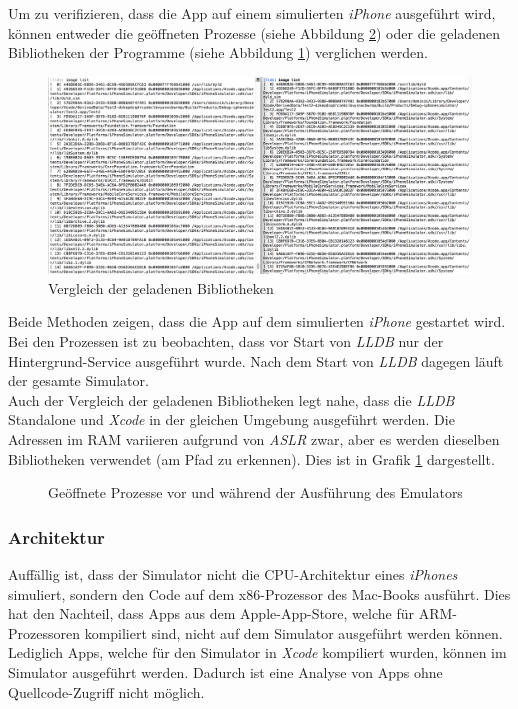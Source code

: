 Um zu verifizieren, dass die App auf einem simulierten \textit{iPhone} ausgeführt wird, können entweder die geöffneten Prozesse (siehe Abbildung \ref{fig:LLDB-creating-IPhone-VM}) oder die geladenen Bibliotheken der Programme (siehe Abbildung \ref{fig:VergleichLLDBImages}) verglichen werden.\\

\begin{figure}[htbp]
	\centering
	\includegraphics[width=\textwidth]{bilder/pentest_mobile_anwendungen/vergleich_aktuelle_situation/20160627_LLDB-image-list.png}
	\caption{Vergleich der geladenen Bibliotheken}
	\label{fig:VergleichLLDBImages}
\end{figure}

Beide Methoden zeigen, dass die App auf dem simulierten \textit{iPhone} gestartet wird. Bei den Prozessen ist zu beobachten, dass vor Start von \textit{LLDB} nur der Hintergrund-Service ausgeführt wurde. Nach dem Start von \textit{LLDB} dagegen läuft der gesamte Simulator.\\

Auch der Vergleich der geladenen Bibliotheken legt nahe, dass die \textit{LLDB} Standalone und \textit{Xcode} in der gleichen Umgebung ausgeführt werden. Die Adressen im RAM variieren aufgrund von \textit{ASLR} zwar, aber es werden dieselben Bibliotheken verwendet (am Pfad zu erkennen). Dies ist in Grafik \ref{fig:VergleichLLDBImages} dargestellt.

\begin{figure}[htbp]

\caption{Geöffnete Prozesse vor und während der Ausführung des Emulators}
\label{fig:LLDB-creating-IPhone-VM}
\end{figure}

\subsubsection{Architektur}\label{ref:VergAktSitiOSArch}
Auffällig ist, dass der Simulator nicht die CPU-Architektur eines \textit{iPhones} simuliert, sondern den Code auf dem x86-Prozessor des Mac-Books ausführt. Dies hat den Nachteil, dass Apps aus dem Apple-App-Store, welche für ARM-Prozessoren kompiliert sind, nicht auf dem Simulator ausgeführt werden können. Lediglich Apps, welche für den Simulator in \textit{Xcode} kompiliert wurden, können im Simulator ausgeführt werden. Dadurch ist eine Analyse von Apps ohne Quellcode-Zugriff nicht möglich.

